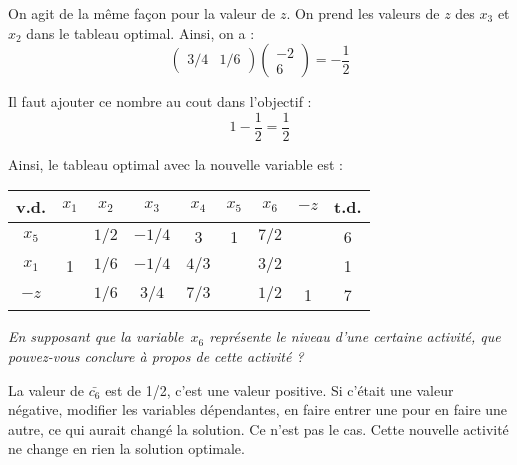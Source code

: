 On agit de la même façon pour la valeur de $z$. On prend les valeurs de $z$ des $x_3$ et $x_2$ dans le tableau optimal. Ainsi, on a :
\[
\begin{pmatrix}
3/4 & 1/6 
\end{pmatrix}
\begin{pmatrix}
-2 \\
6
\end{pmatrix}
=
-\frac{1}{2}
\]

Il faut ajouter ce nombre au cout dans l’objectif :
\[1 -\frac{1}{2} = \frac{1}{2}\]

Ainsi, le tableau optimal avec la nouvelle variable est :

\begin{center}
	\renewcommand{\arraystretch}{1.5}
	\begin{tabular}{|c|ccccccc|c|}
		\hline
		 v.d.   & $x_{1}$ & $x_{2}$ & $x_{3}$ & $x_{4}$ & $x_{5}$ & $x_{6}$ & $-z$ & t.d. \\ \hline
		$x_{5}$ &         &  $1/2$  & $- 1/4$ &    3    &    1    &  $7/2$  &      &  6   \\
		$x_{1}$ &    1    &  $1/6$  & $- 1/4$ &  $4/3$  &         &  $3/2$  &      &  1   \\ \hline
		 $-z$   &         &  $1/6$  &  $3/4$  &  $7/3$  &         &  $1/2$  &  1   &  7   \\ \hline
	\end{tabular}
\end{center}

\emph{En supposant que la variable~$x_6$ représente le niveau d’une certaine activité, que pouvez-vous conclure à propos de cette activité ?}

La valeur de $\bar{c_6}$ est de 1/2, c’est une valeur positive. Si c’était une valeur négative, modifier les variables dépendantes, en faire entrer une pour en faire une autre, ce qui aurait changé la solution. Ce n’est pas le cas. Cette nouvelle activité ne change en rien la solution optimale.
